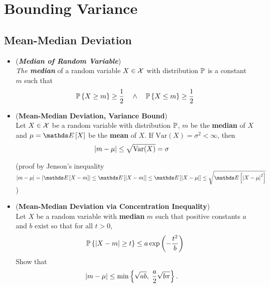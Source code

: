 \documentclass[11pt]{article}
\begin{document}
\section{Bounding Variance}
\subsection{Mean-Median Deviation}
\begin{itemize}
\item \begin{definition} (\emph{\textbf{Median of Random Variable}})\\
\emph{The \textbf{median}} of a random variable $X \in {\mathcal X}$ with distribution ${\mathbb P}$ is a constant $m$ such that
\begin{align*}
{\mathbb P}\left\{X \ge m \right\} \ge \frac{1}{2} \quad \land \quad {\mathbb P}\left\{X \le m \right\} \ge \frac{1}{2}
\end{align*}
\end{definition}

\item \begin{proposition} (\textbf{Mean-Median Deviation, Variance Bound}) \citep{boucheron2013concentration} \\
Let $X \in {\mathcal X}$ be a random variable with distribution ${\mathbb P}$, $m$ be the \textbf{median} of $X$ and $\mu = \E{}{X}$ be the \textbf{mean} of $X$. If $\text{Var}(X) = \sigma^2 < \infty$,  then 
\begin{align}
\left\lvert m - \mu \right\rvert &\le \sqrt{\text{Var}(X)} = \sigma \label{ineqn: median_mean_variance_bound}
\end{align}
\end{proposition} (proof by Jenson's inequality $\abs{m - \mu} = \abs{\E{}{X - m}} \le \E{}{\abs{X - m}} \le \E{}{\abs{X - \mu}} \le \sqrt{\E{}{\abs{X - \mu}^2}}$)

\item \begin{exercise}  (\textbf{Mean-Median Deviation via Concentration Inequality}) \citep{boucheron2013concentration} \\
Let $X$ be a random variable with \textbf{median} $m$ such that positive constants $a$ and $b$ exist so that for all $t > 0$,
\begin{align*}
{\mathbb P}\left\{\left\lvert X - m \right\rvert \ge t\right\} \le a \exp\left(- \frac{t^2}{b}\right)
\end{align*} Show that 
\begin{align*}
\left\lvert m - \mu \right\rvert &\le \min\left\{\sqrt{ab}, \;\frac{a}{2}\sqrt{b\pi}\right\}.
\end{align*}
\end{exercise}


\end{itemize}
\end{document}
